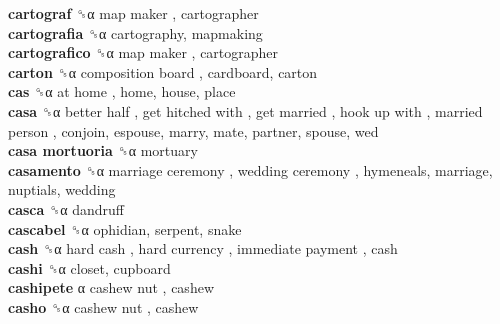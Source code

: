 \textbf{cartograf} ␝α   map maker , cartographer  \\
\textbf{cartografia} ␝α  cartography, mapmaking  \\
\textbf{cartografico} ␝α   map maker , cartographer  \\
\textbf{carton} ␝α   composition board , cardboard, carton  \\
\textbf{cas} ␝α   at home , home, house, place  \\
\textbf{casa} ␝α   better half ,  get hitched with ,  get married ,  hook up with ,  married person , conjoin, espouse, marry, mate, partner, spouse, wed  \\
\textbf{casa mortuoria} ␝α  mortuary  \\
\textbf{casamento} ␝α   marriage ceremony ,  wedding ceremony , hymeneals, marriage, nuptials, wedding  \\
\textbf{casca} ␝α  dandruff  \\
\textbf{cascabel} ␝α  ophidian, serpent, snake  \\
\textbf{cash} ␝α   hard cash ,  hard currency ,  immediate payment , cash  \\
\textbf{cashi} ␝α  closet, cupboard  \\
\textbf{cashipete} α   cashew nut , cashew  \\
\textbf{casho} ␝α   cashew nut , cashew  \\
